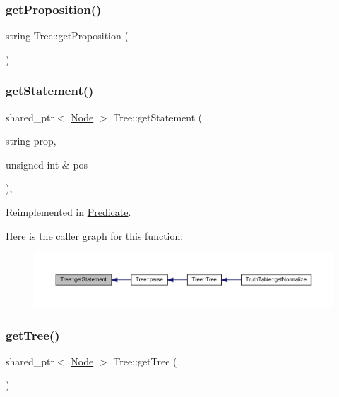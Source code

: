 \subsubsection{\texorpdfstring{get\+Proposition()}{getProposition()}}
{\footnotesize\ttfamily string Tree\+::get\+Proposition (\begin{DoxyParamCaption}{ }\end{DoxyParamCaption})}

\mbox{\label{class_tree_a016c2300dfa5444a52e6e6db7be850d2}} 
\subsubsection{\texorpdfstring{get\+Statement()}{getStatement()}}
{\footnotesize\ttfamily shared\+\_\+ptr$<$ \hyperlink{class_node}{Node} $>$ Tree\+::get\+Statement (\begin{DoxyParamCaption}\item[{string}]{prop,  }\item[{unsigned int \&}]{pos }\end{DoxyParamCaption})\hspace{0.3cm}{\ttfamily [protected]}, {\ttfamily [virtual]}}



Reimplemented in \hyperlink{class_predicate_a0572df9e18344e95ca1ce521d551a0ea}{Predicate}.

Here is the caller graph for this function\+:\nopagebreak
\begin{figure}[H]
\begin{center}
\leavevmode
\includegraphics[width=350pt]{dd/df8/class_tree_a016c2300dfa5444a52e6e6db7be850d2_icgraph}
\end{center}
\end{figure}
\mbox{\label{class_tree_ad9bd7cd558397f596703e92fc47aa91f}} 
\subsubsection{\texorpdfstring{get\+Tree()}{getTree()}}
{\footnotesize\ttfamily shared\+\_\+ptr$<$ \hyperlink{class_node}{Node} $>$ Tree\+::get\+Tree (\begin{DoxyParamCaption}{ }\end{DoxyParamCaption})}

